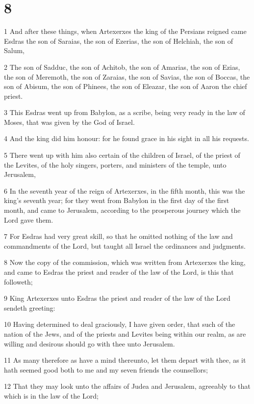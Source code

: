 \chapter{8}

\par 1 And after these things, when Artexerxes the king of the Persians reigned came Esdras the son of Saraias, the son of Ezerias, the son of Helchiah, the son of Salum,
\par 2 The son of Sadduc, the son of Achitob, the son of Amarias, the son of Ezias, the son of Meremoth, the son of Zaraias, the son of Savias, the son of Boccas, the son of Abisum, the son of Phinees, the son of Eleazar, the son of Aaron the chief priest.
\par 3 This Esdras went up from Babylon, as a scribe, being very ready in the law of Moses, that was given by the God of Israel.
\par 4 And the king did him honour: for he found grace in his sight in all his requests.
\par 5 There went up with him also certain of the children of Israel, of the priest of the Levites, of the holy singers, porters, and ministers of the temple, unto Jerusalem,
\par 6 In the seventh year of the reign of Artexerxes, in the fifth month, this was the king's seventh year; for they went from Babylon in the first day of the first month, and came to Jerusalem, according to the prosperous journey which the Lord gave them.
\par 7 For Esdras had very great skill, so that he omitted nothing of the law and commandments of the Lord, but taught all Israel the ordinances and judgments.
\par 8 Now the copy of the commission, which was written from Artexerxes the king, and came to Esdras the priest and reader of the law of the Lord, is this that followeth;
\par 9 King Artexerxes unto Esdras the priest and reader of the law of the Lord sendeth greeting:
\par 10 Having determined to deal graciously, I have given order, that such of the nation of the Jews, and of the priests and Levites being within our realm, as are willing and desirous should go with thee unto Jerusalem.
\par 11 As many therefore as have a mind thereunto, let them depart with thee, as it hath seemed good both to me and my seven friends the counsellors;
\par 12 That they may look unto the affairs of Judea and Jerusalem, agreeably to that which is in the law of the Lord;
